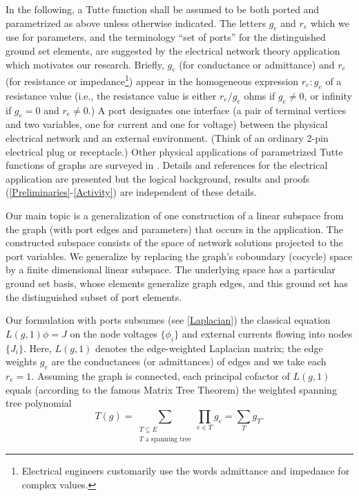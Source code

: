 \documentclass[12pt]{article}
\theoremstyle{definition}
\begin{document}
In the following, a Tutte function shall be assumed to be 
both ported and parametrized as above unless otherwise indicated.  The letters
$g_e$ and $r_e$ which we use for parameters, and the terminology
``set of ports'' for the distinguished ground set elements,
are suggested by the electrical network theory 
application which motivates our research.  Briefly, $g_e$ (for conductance
or admittance)
and $r_e$ 
(for resistance or impedance\footnote{Electrical engineers
customarily use the words admittance and impedance for complex values.}) 
appear in the homogeneous 
expression $r_e:g_e$ of a resistance value (i.e., the resistance value
is either $r_e/g_e$ ohms if $g_e\neq 0$, or 
infinity if $g_e=0$ and $r_e\neq 0$.)
A port
designates one interface 
(a pair of terminal vertices and two variables, 
one for current and one for voltage) between the physical electrical network
and an external environment.  (Think of an ordinary 2-pin electrical
plug or receptacle.)  
Other physical applications of parametrized Tutte functions of graphs are 
surveyed in \cite{Sokal}.  
Details and references for the electrical application are presented
but the logical background, results and proofs 
(\textsection \ref{Preliminaries}-\ref{Activity})
are independent of these details.

Our main topic is a generalization of one construction of a 
linear subspace from the graph (with port edges and parameters)
that occurs in the application.  The constructed
subspace consists of the space of network solutions projected to
the port variables.  We generalize by replacing the graph's coboundary
(cocycle) space by a finite dimensional linear subspace.  The underlying
space has a particular ground set basis, whose elements
generalize graph edges, and this ground set has the distinguished 
subset of port elements.

Our formulation with ports subsumes 
(see \textsection\ref{Laplacian}) the classical 
equation $L(g,1)\phi = J$ on the node voltages $\{\phi_i\}$ and 
external currents flowing into nodes $\{J_i\}$.  Here, $L(g,1)$ denotes the
edge-weighted Laplacian matrix; the edge weights $g_e$ are the conductances
(or admittances) of edges and we take each $r_e=1$.  Assuming the graph is
connected, each principal cofactor of $L(g,1)$ equals (according to the
famous Matrix Tree Theorem) the weighted spanning
tree polynomial
\[
T(g)=\sum_{
\substack{T\subseteq E\\
T\text{ a spanning tree}
         }
          }
\prod_{e\in T}g_e
=
\sum_{T}g_T.
\]
\end{document}
